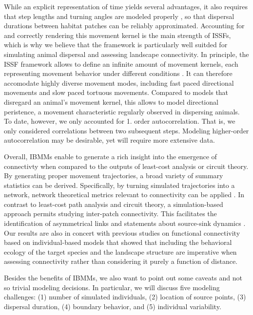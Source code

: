 \documentclass[abstract=on,10pt,a4paper,bibliography=totocnumbered]{article}
\begin{document}
While an explicit representation of time yields several advantages, it also
requires that step lengths and turning angles are modeled properly
\citep{Kanagaraj.2013}, so that dispersal durations between habitat patches can
be reliably approximated. Accounting for and correctly rendering this movement
kernel is the main strength of ISSFs, which is why we believe that the framework
is particularly well suitded for simulating animal dispersal and assessing
landscape connectivity. In principle, the ISSF framework allows to define an
infinite amount of movement kernels, each representing movement behavior under
different conditions \citep{Fieberg.2020}. It can therefore accomodate highly
diverse movement modes, including fast paced directional movements and slow
paced tortuous movements. Compared to models that disregard an animal's movement
kernel, this allows to model directional peristence, a movement characteristic
regularly observed in dispersing animals. To date, however, we only accounted
for 1. order autocorrelation. That is, we only considered correlations between
two subsequent steps. Modeling higher-order autocorrelation may be desirable,
yet will require more extensive data.

Overall, IBMMs enable to generate a rich insight into the emergence of
connectivty when compared to the outputs of least-cost analysis or circuit
theory. By generating proper movement trajectories, a broad variety of summary
statistics can be derived. Specifically, by turning simulated trajectories into
a network, network theoretical metrics relevant to connectivity can be applied
\citep{BastilleRousseau.2018}. In contrast to least-cost path analysis and
circuit theory, a simulation-based approach permits studying inter-patch
connectivity. This facilitates the identification of asymmetrical links and
statements about source-sink dynamics \citep{Ferreras.2001, Revilla.2004,
Kanagaraj.2013}. Our results are also in concert with previous studies on
functional connectivity based on individual-based models that showed that
including the behavioral ecology of the target species and the landscape
structure are imperative when assessing connectivity \citep{Gustafson.1996,
Gardner.2004, Graf.2007, KramerSchadt.2004, Revilla.2004, Revilla.2008,
Kanagaraj.2013} rather than considering it purely a function of distance.

Besides the benefits of IBMMs, we also want to point out some caveats and not so
trivial modeling decisions. In particular, we will discuss five modeling
challenges: (1) number of simulated individuals, (2) location of source points,
(3) dispersal duration, (4) boundary behavior, and (5) individual variability.
\end{document}
